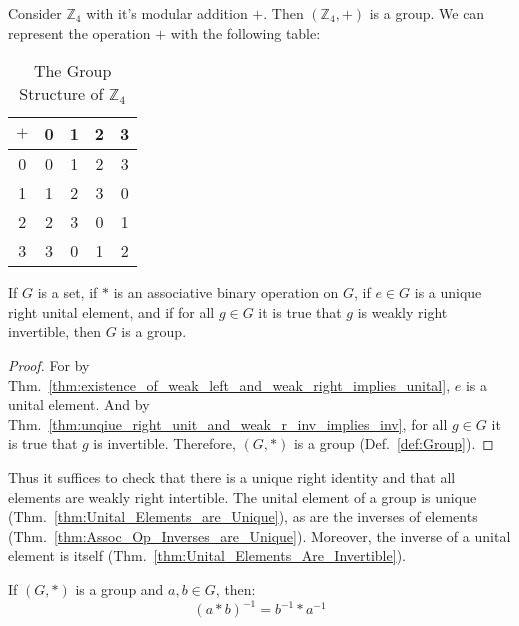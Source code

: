     \begin{example}
        Consider $\mathbb{Z}_{4}$ with it's modular addition $+$. Then
        $(\mathbb{Z}_{4},+)$ is a group. We can represent the operation $+$ with
        the following table:
        \begin{table}[H]
            \centering
            \captionsetup{type=table}
            \begin{tabular}{c|cccc}
                $+$&0&1&2&3\\
                \hline
                0&0&1&2&3\\
                1&1&2&3&0\\
                2&2&3&0&1\\
                3&3&0&1&2
            \end{tabular}
            \caption{The Group Structure of $\mathbb{Z}_{4}$}
        \end{table}
    \end{example}
    \begin{theorem}
        If $G$ is a set, if $*$ is an associative binary operation on $G$, if
        $e\in{G}$ is a unique right unital element, and if for all $g\in{G}$ it
        is true that $g$ is weakly right invertible, then $G$ is a group.
    \end{theorem}
    \begin{proof}
        For by
        Thm.~\ref{thm:existence_of_weak_left_and_weak_right_implies_unital},
        $e$ is a unital element. And by
        Thm.~\ref{thm:unqiue_right_unit_and_weak_r_inv_implies_inv}, for all
        $g\in{G}$ it is true that $g$ is invertible. Therefore, $(G,*)$ is a
        group (Def.~\ref{def:Group}).
    \end{proof}
    Thus it suffices to check that there is a unique right identity and that all
    elements are weakly right intertible. The unital element of a group is
    unique (Thm.~\ref{thm:Unital_Elements_are_Unique}), as are the inverses of
    elements (Thm.~\ref{thm:Assoc_Op_Inverses_are_Unique}). Moreover, the
    inverse of a unital element is itself
    (Thm.~\ref{thm:Unital_Elements_Are_Invertible}).
    \begin{theorem}
        \label{thm:Group_Inverse_of_Product}%
        If $(G,*)$ is a group and $a,b\in G$, then:
        \begin{equation}
            (a*b)^{\minus{1}}=b^{\minus{1}}*a^{\minus{1}}
        \end{equation}
    \end{theorem}
